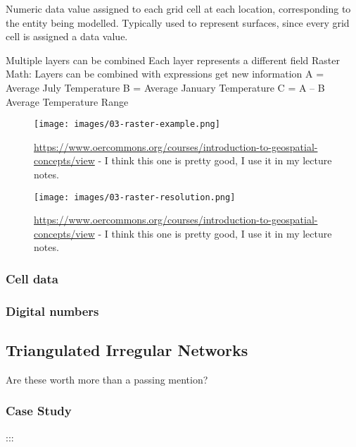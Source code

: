 \documentclass[
]{book}
\begin{document}
Numeric data value assigned to each grid cell at each location, corresponding to the entity being modelled.
Typically used to represent surfaces, since every grid cell is assigned a data value.

Multiple layers can be combined
Each layer represents a different field
Raster Math:
Layers can be combined with expressions get new information
A = Average July Temperature
B = Average January Temperature
C = A -- B
Average Temperature Range

\begin{figure}
\centering
\texttt{[image: images/03-raster-example.png]}
\caption{\url{https://www.oercommons.org/courses/introduction-to-geospatial-concepts/view} - I think this one is pretty good, I use it in my lecture notes.}
\end{figure}

\begin{figure}
\centering
\texttt{[image: images/03-raster-resolution.png]}
\caption{\url{https://www.oercommons.org/courses/introduction-to-geospatial-concepts/view} - I think this one is pretty good, I use it in my lecture notes.}
\end{figure}

\hypertarget{cell-data}{%
\subsubsection{Cell data}\label{cell-data}}

\hypertarget{digital-numbers}{%
\subsubsection{Digital numbers}\label{digital-numbers}}

\hypertarget{triangulated-irregular-networks}{%
\subsection{Triangulated Irregular Networks}\label{triangulated-irregular-networks}}

Are these worth more than a passing mention?

\hypertarget{case-study-1}{%
\subsubsection*{Case Study}\label{case-study-1}}

:::
\end{document}
